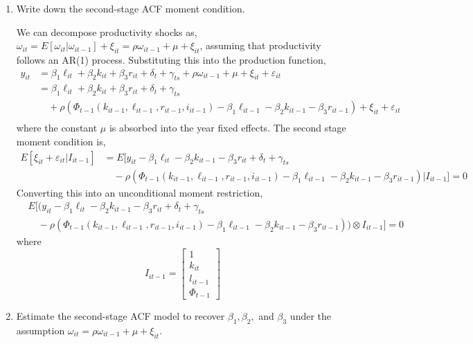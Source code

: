 \documentclass{article}
\begin{document}
\begin{enumerate}
\item Write down the second-stage ACF moment condition.

\begin{answer}
We can decompose productivity shocks as, $\omega_{it} = E[\omega_{it} | \omega_{it-1}] + \xi_{it} = \rho\omega_{it-1} + \mu + \xi_{it}$, assuming that productivity follows an AR(1) process. Substituting this into the production function,
\begin{align*}
    y_{it} &= \beta_1 \ell_{it} + \beta_2 k_{it} + \beta_3 r_{it} + \delta_t + \gamma_{ts} + \rho\omega_{it-1} + \mu + \xi_{it} + \varepsilon_{it} \\
    &= \beta_1 \ell_{it} + \beta_2 k_{it} + \beta_3 r_{it} + \delta_t + \gamma_{ts} \\
    &\quad+ \rho(\Phi_{t-1}(k_{it-1}, \ell_{it-1}, r_{it-1},i_{it-1}) - \beta_1 \ell_{it-1} - \beta_2 k_{it-1} - \beta_3 r_{it-1}) + \xi_{it} + \varepsilon_{it} \\
\end{align*}
where the constant $\mu$ is absorbed into the year fixed effects. The second stage moment condition is,
\begin{align*}
    E[\xi_{it} + \varepsilon_{it} | I_{it-1}]&=E[y_{it} - \beta_1 \ell_{it} - \beta_2 k_{it-1} - \beta_3 r_{it} + \delta_t + \gamma_{ts} \\
    &\quad -\rho(\Phi_{t-1}(k_{it-1}, \ell_{it-1}, r_{it-1},i_{it-1}) - \beta_1 \ell_{it-1} - \beta_2 k_{it-1} - \beta_3 r_{it-1})|I_{it-1}]=0
\end{align*}
Converting this into an unconditional moment restriction,
\begin{align*}
    &E[(y_{it} - \beta_1 \ell_{it} - \beta_2 k_{it-1} - \beta_3 r_{it} + \delta_t + \gamma_{ts} \\
    &\quad -\rho(\Phi_{t-1}(k_{it-1}, \ell_{it-1}, r_{it-1},i_{it-1}) - \beta_1 \ell_{it-1} - \beta_2 k_{it-1} - \beta_3 r_{it-1})) \otimes I_{it-1}]=0
\end{align*}
where 
$$I_{it-1} = \begin{bmatrix}
    1 \\
    k_{it} \\
    l_{it-1} \\
    \Phi_{t-1}
\end{bmatrix}$$

\end{answer}
\item Estimate the second-stage ACF model to recover $\beta_1, \beta_2,$ and $\beta_3$ under the assumption $\omega_{it} = \rho \omega_{i t-1} + \mu + \xi_{it}.$


\end{enumerate}
\end{document}
